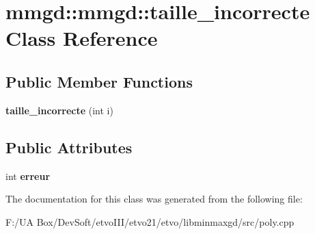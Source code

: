 \section{mmgd\+:\+:mmgd\+:\+:taille\+\_\+incorrecte Class Reference}
\label{classmmgd_1_1mmgd_1_1taille__incorrecte}
\subsection*{Public Member Functions}
\begin{DoxyCompactItemize}
\item 
\mbox{\label{classmmgd_1_1mmgd_1_1taille__incorrecte_a509574ad9277c7311108e3649b66c7b2}} 
{\bfseries taille\+\_\+incorrecte} (int i)
\end{DoxyCompactItemize}
\subsection*{Public Attributes}
\begin{DoxyCompactItemize}
\item 
\mbox{\label{classmmgd_1_1mmgd_1_1taille__incorrecte_a894c126fc36f8c033b26b7bfe106fd28}} 
int {\bfseries erreur}
\end{DoxyCompactItemize}


The documentation for this class was generated from the following file\+:\begin{DoxyCompactItemize}
\item 
F\+:/\+U\+A Box/\+Dev\+Soft/etvo\+I\+I\+I/etvo21/etvo/libminmaxgd/src/poly.\+cpp\end{DoxyCompactItemize}
